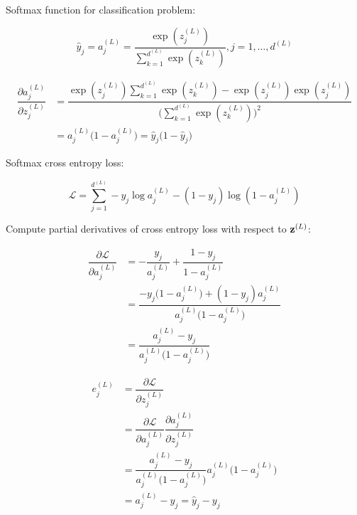 \documentclass[14pt, a4paper]{article}
\numberwithin{equation}{section}
\numberwithin{algorithm}{section}
\numberwithin{figure}{section}
\begin{document}
Softmax function for classification problem:

\begin{equation}
  \hat{y}_j = a_j^{(L)}=\dfrac{\exp(z_j^{(L)})}{\sum_{k=1}^{d^{(L)}}\exp(z_k^{(L)})}, j=1,\dots, d^{(L)}
\end{equation}

\begin{equation}
  \begin{aligned}
    \dfrac{\partial a_j^{(L)}}{\partial z_j^{(L)}}&=\dfrac{\exp(z_j^{(L)})\sum_{k=1}^{d^{(L)}}\exp(z_k^{(L)}) - \exp(z_j^{(L)})\exp(z_j^{(L)})}{\Bigg(\sum_{k=1}^{d^{(L)}}\exp(z_k^{(L)})\Bigg)^2}\\&=a_j^{(L)}\Big(1- a_j^{(L)} \Big)=\hat{y}_j \Big(1 - \hat{y}_j\Big)
  \end{aligned}
\end{equation}

Softmax cross entropy loss:

\begin{equation}
  \mathcal{L}=\sum_{j=1}^{d^{(L)}}-y_j \log a_j^{(L)}-(1-y_j)\log(1-a_j^{(L)})
\end{equation}

Compute partial derivatives of cross entropy loss with respect to $\bold{z}^{(L)}$:

\begin{equation}
  \begin{aligned}
    \dfrac{\partial \mathcal{L}}{\partial a_j^{(L)}}&=-\dfrac{y_j}{a_j^{(L)}}+\dfrac{1-y_j}{1-a_j^{(L)}}\\&=\dfrac{-y_j\Big(1-a_j^{(L)}\Big)+(1-y_j)a_j^{(L)}}{a_j^{(L)}\Big(1-a_j^{(L)}\Big)}\\&=\dfrac{a_j^{(L)}-y_j}{a_j^{(L)}\Big(1-a_j^{(L)}\Big)}
  \end{aligned}
\end{equation}

\begin{equation}
  \begin{aligned}
    e_j^{(L)}&=\dfrac{\partial \mathcal{L}}{\partial z_j^{(L)}}\\&=\dfrac{\partial \mathcal{L}}{\partial a_j^{(L)}}\dfrac{\partial a_j^{(L)}}{\partial z_j^{(L)}}\\&=\dfrac{a_j^{(L)}-y_j}{a_j^{(L)}\Big(1-a_j^{(L)}\Big)}a_j^{(L)}\Big(1- a_j^{(L)} \Big)\\&=a_j^{(L)} - y_j =\hat{y}_j - y_j
  \end{aligned}
\end{equation}
\end{document}
